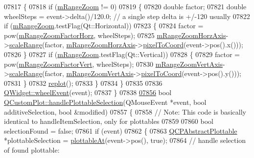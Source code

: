 \begin{DoxyCode}
07817   \{
07818     \textcolor{keywordflow}{if} (\hyperlink{a00116_ac12a0fb503fccb899d786ceaa0a1a4f7}{mRangeZoom} != 0)
07819     \{
07820       \textcolor{keywordtype}{double} factor;
07821       \textcolor{keywordtype}{double} wheelSteps = \textcolor{keyword}{event}->delta()/120.0; \textcolor{comment}{// a single step delta is +/-120 usually}
07822       \textcolor{keywordflow}{if} (\hyperlink{a00116_ac12a0fb503fccb899d786ceaa0a1a4f7}{mRangeZoom}.testFlag(Qt::Horizontal))
07823       \{
07824         factor = pow(\hyperlink{a00116_a575195f0c4e9f7a766495da2ac41e0a6}{mRangeZoomFactorHorz}, wheelSteps);
07825         \hyperlink{a00116_a3239b66fb24563a5dda0503a69a892d5}{mRangeZoomHorzAxis}->\hyperlink{a00025_a7072ff96fe690148f1bbcdb4f773ea1c}{scaleRange}(factor, 
      \hyperlink{a00116_a3239b66fb24563a5dda0503a69a892d5}{mRangeZoomHorzAxis}->\hyperlink{a00025_ae9289ef7043b9d966af88eaa95b037d1}{pixelToCoord}(event->pos().x()));
07826       \}
07827       \textcolor{keywordflow}{if} (\hyperlink{a00116_ac12a0fb503fccb899d786ceaa0a1a4f7}{mRangeZoom}.testFlag(Qt::Vertical))
07828       \{
07829         factor = pow(\hyperlink{a00116_a133700b56f6b8e472f99058b43f5a0e9}{mRangeZoomFactorVert}, wheelSteps);
07830         \hyperlink{a00116_a16094e9a3c30151c3c820cd9d4894b84}{mRangeZoomVertAxis}->\hyperlink{a00025_a7072ff96fe690148f1bbcdb4f773ea1c}{scaleRange}(factor, 
      \hyperlink{a00116_a16094e9a3c30151c3c820cd9d4894b84}{mRangeZoomVertAxis}->\hyperlink{a00025_ae9289ef7043b9d966af88eaa95b037d1}{pixelToCoord}(event->pos().y()));
07831       \}
07832       \hyperlink{a00116_a563540b54b2a09c8ef092d42e9621f42}{replot}();
07833     \}
07834   \}
07835   
07836   \hyperlink{a00116_a7b8bd7e8d3a1d23a8595e9c6a6b76ef1}{QWidget::wheelEvent}(event);
07837 \}
07838 
\hypertarget{a00115_source_l07856}{}\hyperlink{a00116_a881c8652ebb912345de27687817845cf}{07856} \textcolor{keywordtype}{bool} \hyperlink{a00116_a881c8652ebb912345de27687817845cf}{QCustomPlot::handlePlottableSelection}(QMouseEvent *event, \textcolor{keywordtype}{bool} 
      additiveSelection, \textcolor{keywordtype}{bool} &modified)
07857 \{
07858   \textcolor{comment}{// Note: This code is basically identical to handleItemSelection, only for plottables}
07859   
07860   \textcolor{keywordtype}{bool} selectionFound = \textcolor{keyword}{false};
07861   \textcolor{keywordflow}{if} (event)
07862   \{
07863     \hyperlink{a00024}{QCPAbstractPlottable} *plottableSelection = \hyperlink{a00116_ac1d1bc6ae4e13616fb02cef6d9e2188e}{plottableAt}(event->pos(), \textcolor{keyword}{
      true});
07864     \textcolor{comment}{// handle selection of found plottable:}

\end{DoxyCode}
